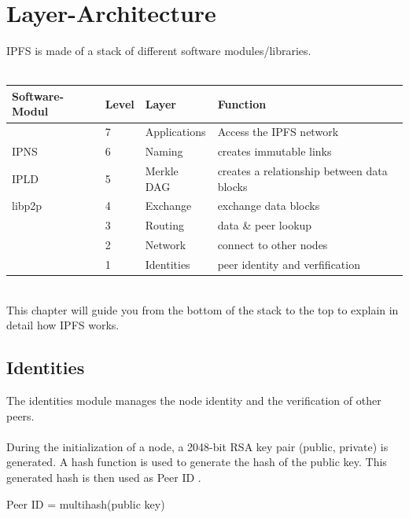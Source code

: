 \documentclass[a4paper,11pt, oneside]{report}
\theoremstyle{definition}
\begin{document}
\chapter{Layer-Architecture}
IPFS is made of a stack of different software modules/libraries.\\ \\
\noindent
\begin{tabularx}{\textwidth}{XXXl}
\textbf{Software-Modul} &\textbf{Level} & \textbf{Layer} & \textbf{Function}\\ \hline
&7& Applications & Access the IPFS network \\ \hline
IPNS  &6 & Naming & creates immutable links \\ \hline
IPLD&5 & Merkle DAG & creates a relationship between data blocks \\ \hline
libp2p&4 & Exchange & exchange data blocks\\ 
&3 & Routing  & data \& peer lookup\\
&2 & Network  & connect to other nodes \\ 
&1 & Identities  & peer identity and verfification \\ \hline
\end{tabularx}\\[0.4cm]
This chapter will guide you from the bottom of the stack to the top to explain in detail how IPFS works.

\newpage

\section{Identities}
The identities module manages the node identity and the verification of other peers.\\ \\
During the initialization of a node, a 2048-bit RSA key pair (public, private) is generated. A hash function is used to generate the hash of the public key. This generated hash is then used as Peer ID \cite{PeerID}.
\begin{center}
Peer ID = multihash(public key)
\end{center}
\end{document}
